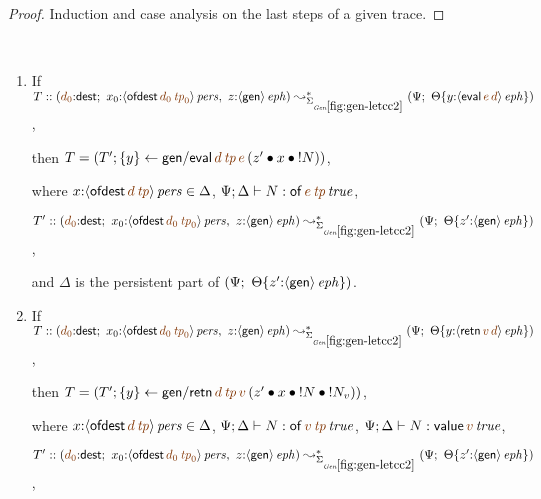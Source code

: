\begin{proof}
Induction and case analysis on the last steps of a given trace.
\end{proof}

\begin{lemma} ~
\begin{enumerate}
\item If $T :: \left(\lf{d_0}{:}{\sf dest}; ~ x_0{:}\ispers{\susp{{\sf
          ofdest}\,\lf{d_0}\,\lf{{\it tp}_0}}}, ~ z{:}\iseph{\susp{{\sf
          gen}}}\right) \leadsto^*_{\siggenletcc} \left(\Psi; ~
    \tackon{\Theta}{y{:}\iseph{\susp{{\sf
            eval}\,\lf{e}\,\lf{d}}}}\right)$,

    then $T = (T'; \trstep{y}{{\sf gen/eval}\,\lf{d}\,\lf{{\it tp}}\,\lf{e}\,
      (\tfuser{z'}{\tfuser{x}{\tbangr{N}}})})$,

    where $x{:}\ispers{\susp{{\sf ofdest}\,\lf{d}\,\lf{{\it tp}}}} \in \Delta$,
    $\Psi; \Delta \vdash N : \isconc{{\sf of}\,\lf{e}\,\lf{{\it tp}}}$,
    
    $T' :: \left(\lf{d_0}{:}{\sf dest}; ~ x_0{:}\ispers{\susp{{\sf
          ofdest}\,\lf{d_0}\,\lf{{\it tp}_0}}}, ~ z{:}\iseph{\susp{{\sf
          gen}}}\right) \leadsto^*_{\siggenletcc}
          \left(\Psi; ~ \tackon{\Theta}{z'{:}\iseph{\susp{{\sf gen}}}}\right)$,

    and $\Delta$ is the persistent part of 
    $\left(\Psi; ~ {\Theta}\{{z'{:}{\langle {{\sf gen}} \rangle}\,{{\it eph}}}\}\right)$.

\medskip
\item If $T :: \left(\lf{d_0}{:}{\sf dest}; ~ x_0{:}\ispers{\susp{{\sf
          ofdest}\,\lf{d_0}\,\lf{{\it tp}_0}}}, ~ z{:}\iseph{\susp{{\sf
          gen}}}\right) \leadsto^*_{\siggenletcc} \left(\Psi; ~
    \tackon{\Theta}{y{:}\iseph{\susp{{\sf
            retn}\,\lf{v}\,\lf{d}}}}\right)$,

    then $T = (T'; \trstep{y}{{\sf gen/retn}\,\lf{d}\,\lf{{\it tp}}\,\lf{v}\,
      (\tfuser{z'}{\tfuser{x}{\tfuser{\tbangr{N}}{\tbangr{N_v}}}})})$,

    where $x{:}\ispers{\susp{{\sf ofdest}\,\lf{d}\,\lf{{\it tp}}}} \in \Delta$,
    $\Psi; \Delta \vdash N : \isconc{{\sf of}\,\lf{v}\,\lf{{\it tp}}}$,
    $\Psi; \Delta \vdash N : \isconc{{\sf value}\,\lf{v}}$,
    
    $T' :: \left(\lf{d_0}{:}{\sf dest}; ~ x_0{:}\ispers{\susp{{\sf
          ofdest}\,\lf{d_0}\,\lf{{\it tp}_0}}}, ~ z{:}\iseph{\susp{{\sf
          gen}}}\right) \leadsto^*_{\siggenletcc}
          \left(\Psi; ~ \tackon{\Theta}{z'{:}\iseph{\susp{{\sf gen}}}}\right)$,


\end{enumerate}
\end{lemma}
